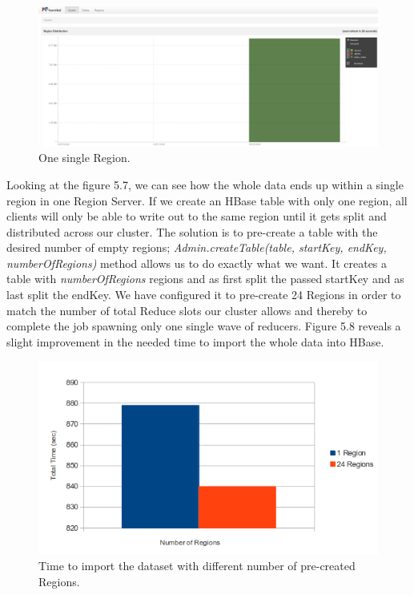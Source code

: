 \begin{figure}[htb]
\centering
\includegraphics[width=1\textwidth]{./images/1reducer.png}
\caption{One single Region.} \label{fig:oneRegion}
\end{figure}



Looking at the figure 5.7, we can see how the whole data ends up within a single region in one Region Server. If we create an HBase table with only one region, all clients will only be able to write out to the same region until it gets split and distributed across our cluster. The solution is to pre-create a table with the desired number of empty regions; \textit{Admin.createTable(table, startKey, endKey, numberOfRegions)} method allows us to do exactly what we want. It creates a table with \textit{numberOfRegions} regions and as first split the passed startKey and as last split the endKey. We have configured it to pre-create 24 Regions in order to match the number of total Reduce slots our cluster allows and thereby to complete the job spawning only one single wave of reducers. Figure 5.8 reveals a slight improvement in the needed time to import the whole data into HBase.


\begin{figure}[htb]
\centering
\includegraphics[width=1\textwidth]{./images/1-24regions.png}
\caption{Time to import the dataset with different number of pre-created Regions.} \label{fig:regions}
\end{figure}

